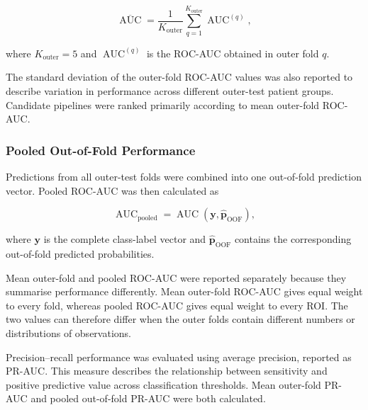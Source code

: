 \documentclass[12pt,twocolumn]{article}
\begin{document}
\begin{equation}
\overline{\operatorname{AUC}}
=
\frac{1}{K_{\mathrm{outer}}}
\sum_{q=1}^{K_{\mathrm{outer}}}
\operatorname{AUC}^{(q)},
\label{eq:mean_outer_auc}
\end{equation}

where \(K_{\mathrm{outer}}=5\) and
\(\operatorname{AUC}^{(q)}\) is the ROC-AUC obtained in outer fold
\(q\).

The standard deviation of the outer-fold ROC-AUC values was also
reported to describe variation in performance across different
outer-test patient groups. Candidate pipelines were ranked primarily
according to mean outer-fold ROC-AUC.






\subsubsection{Pooled Out-of-Fold Performance}
\label{subsubsec:pooled_performance}

Predictions from all outer-test folds were combined into one
out-of-fold prediction vector. Pooled ROC-AUC was then calculated as

\begin{equation}
\operatorname{AUC}_{\mathrm{pooled}}
=
\operatorname{AUC}
\left(
\mathbf{y},
\widehat{\mathbf{p}}_{\mathrm{OOF}}
\right),
\label{eq:pooled_auc}
\end{equation}

where \(\mathbf{y}\) is the complete class-label vector and
\(\widehat{\mathbf{p}}_{\mathrm{OOF}}\) contains the corresponding
out-of-fold predicted probabilities.

Mean outer-fold and pooled ROC-AUC were reported separately because
they summarise performance differently. Mean outer-fold ROC-AUC gives
equal weight to every fold, whereas pooled ROC-AUC gives equal weight
to every ROI. The two values can therefore differ when the outer folds
contain different numbers or distributions of observations.

Precision--recall performance was evaluated using average precision,
reported as PR-AUC. This measure describes the relationship between
sensitivity and positive predictive value across classification
thresholds. Mean outer-fold PR-AUC and pooled out-of-fold PR-AUC were
both calculated.
\end{document}
